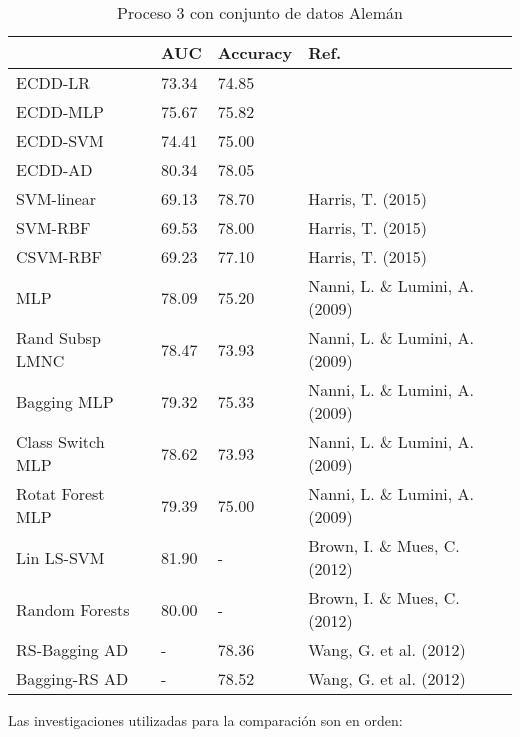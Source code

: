 \begin{table}[]
\centering
\caption{Proceso 3 con conjunto de datos Alemán}
\label{tab:german-proc3}
\begin{tabularx}{\textwidth}{|l|Y Y l|}
                        \hline
                        & AUC       & Accuracy  & Ref.                                  \\
                        \hline
ECDD-LR                   & 73.34     & 74.85     &                                       \\
ECDD-MLP                  & 75.67     & 75.82     &                                       \\
ECDD-SVM                  & 74.41     & 75.00     &                                       \\
ECDD-AD                   & 80.34     & 78.05     &                                       \\
                        \hline
SVM-linear              & 69.13     & 78.70     & Harris, T. (2015)                     \\
SVM-RBF                 & 69.53     & 78.00     & Harris, T. (2015)                     \\
CSVM-RBF                & 69.23     & 77.10     & Harris, T. (2015)                     \\
MLP                     & 78.09     & 75.20     & Nanni, L. \& Lumini, A. (2009)        \\
Rand Subsp LMNC         & 78.47     & 73.93     & Nanni, L. \& Lumini, A. (2009)        \\
Bagging MLP             & 79.32     & 75.33     & Nanni, L. \& Lumini, A. (2009)        \\
Class Switch MLP        & 78.62     & 73.93     & Nanni, L. \& Lumini, A. (2009)        \\
Rotat Forest MLP        & 79.39     & 75.00     & Nanni, L. \& Lumini, A. (2009)        \\
Lin LS-SVM              & 81.90     & -         & Brown, I. \& Mues, C. (2012)          \\
Random Forests          & 80.00     & -         & Brown, I. \& Mues, C. (2012)          \\
RS-Bagging AD           & -         & 78.36     & Wang, G. et al. (2012)                \\
Bagging-RS AD           & -         & 78.52     & Wang, G. et al. (2012)                \\
                        \hline
\end{tabularx}
\par
\small
Las investigaciones utilizadas para la comparación son en orden: \cite{harris2015credit, nanni2009experimental, brown2012experimental, wang2012two}
\end{table}

